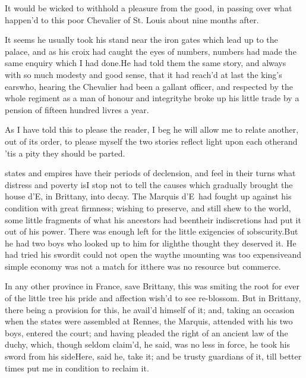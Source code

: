 \documentclass[twoside]{article}
\begin{document}
It would be wicked to withhold a pleasure
from the good, in passing over what
happen’d to this poor Chevalier of St.
Louis about nine months after.

It seems he usually took his stand near
the iron gates which lead up to the
palace, and as his croix had caught the
eyes of numbers, numbers had made the same
enquiry which I had done.\tskk He had told
them the same story, and always with so
much modesty and good sense, that it had
reach’d at last the king’s ears\tskk who,
hearing the Chevalier had been a gallant
officer, and respected by the whole
regiment as a man of honour and
integrity\tskk he broke up his little
trade by a pension of fifteen hundred
livres a year.

As I have told this to please the reader,
I beg he will allow me to relate another,
out of its order, to please myself\tskk
the two stories reflect light upon each
other\tskk and ’tis a pity they should be
parted.





\vskip 6pt


 states and empires have
their periods of declension, and feel in
their turns what distress and poverty
is\tskk I stop not to tell the causes
which gradually brought the house
d’E\anon, in Brittany, into decay.  The
Marquis d’E\anon\ had fought up against
his condition with great firmness; wishing
to preserve, and still shew to the world,
some little fragments of what his
ancestors had been\tskk their
indiscretions had put it out of his power.
There was enough left for the little
exigencies of \i{obscurity}.\tskk But he
had two boys who looked up to him for
\i{light}\tskk he thought they deserved
it.  He had tried his sword\tskk it could
not open the way\tskk the \i{mounting}
was too expensive\tskk and simple economy
was not a match for it\tskk there was no
resource but commerce.

In any other province in France, save
Brittany, this was smiting the root for
ever of the little tree his pride and
affection wish’d to see re-blossom.\tskk
But in Brittany, there being a provision
for this, he avail’d himself of it; and,
taking an occasion when the states were
assembled at Rennes, the Marquis, attended
with his two boys, entered the court; and
having pleaded the right of an ancient law
of the duchy, which, though seldom
claim’d, he said, was no less in force, he
took his sword from his side\tskk Here,
said he, take it; and be trusty guardians
of it, till better times put me in
condition to reclaim it.
\end{document}
